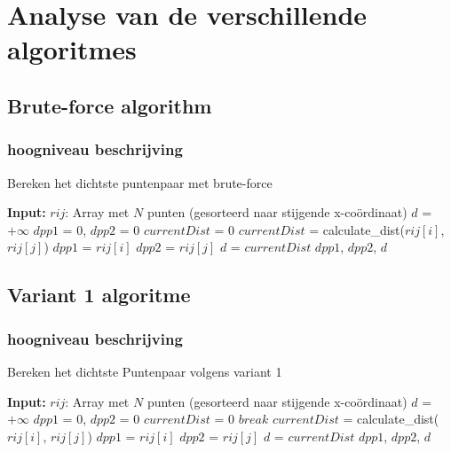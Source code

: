 \documentclass[12pt]{article}
\begin{document}
\newpage

\section{Analyse van de verschillende algoritmes}

\subsection{Brute-force algorithm}

\subsubsection{hoogniveau beschrijving}

\begin{algorithm}
\caption{Bereken het dichtste puntenpaar met brute-force}
\begin{algorithmic}
	\STATE \textbf{Input:}  $rij$: Array met $N$ punten (gesorteerd naar stijgende x-co\"ordinaat)
  \STATE $d$ = $+\infty$
	\STATE $dpp1$ = 0, $dpp2$ = 0
  \STATE $currentDist$ = 0
      \STATE $currentDist$ = calculate\_dist($rij[i]$, $rij[j]$)
				\STATE $dpp1$ = $rij[i]$
				\STATE $dpp2$ = $rij[j]$
        \STATE $d$ = $currentDist$
  		\ENDIF
    \ENDFOR
  \ENDFOR
  \RETURN $dpp1$, $dpp2$, $d$
\end{algorithmic}
\end{algorithm}

\newpage
\subsection{Variant 1 algoritme}
\subsubsection{hoogniveau beschrijving}

\begin{algorithm}
\caption{Bereken het dichtste Puntenpaar volgens variant 1}
\begin{algorithmic}
	\STATE \textbf{Input:}  $rij$: Array met $N$ punten (gesorteerd naar stijgende x-co\"ordinaat)
	\STATE $d$ = $+\infty$
	\STATE $dpp1$ = 0, $dpp2$ = 0
	\STATE $currentDist$ = 0
			\STATE $break$
		\ENDIF
		\STATE $currentDist$ = calculate\_dist($rij[i]$, $rij[j]$)
				\STATE $dpp1$ = $rij[i]$
				\STATE $dpp2$ = $rij[j]$
				\STATE $d$ = $currentDist$
			\ENDIF
		\ENDFOR
	\ENDFOR
	\RETURN $dpp1$, $dpp2$, $d$
\end{algorithmic}
\end{algorithm}
\end{document}
